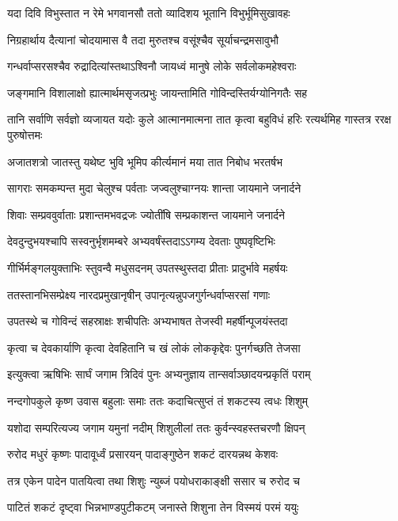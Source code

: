 \twolineshloka
{यदा दिवि विभुस्तात न रेमे भगवानसौ}
{ततो व्यादिशय भूतानि विभुर्भूमिसुखावहः}


\twolineshloka
{निग्रहार्थाय दैत्यानां चोदयामास वै तदा}
{मुरुतश्च वसूंश्चैव सूर्याचन्द्रमसावुभौ}


\twolineshloka
{गन्धर्वाप्सरसश्चैव रुद्रादित्यांस्तथाऽश्विनौ}
{जायध्वं मानुषे लोके सर्वलोकमहेश्वराः}


\twolineshloka
{जङ्गमानि विशालाक्षो ह्यात्मार्थमसृजत्प्रभुः}
{जायन्तामिति गोविन्दस्तिर्यग्योनिगतैः सह}


\fourlineindentedshloka
{तानि सर्वाणि सर्वज्ञो व्यजायत यदोः कुले}
{आत्मानमात्मना तात कृत्वा बहुविधं हरिः}
{रत्यर्थमिह गास्तत्र ररक्ष पुरुषोत्तमः}
{}


\twolineshloka
{अजातशत्रो जातस्तु यथेष्ट भुवि भूमिप}
{कीर्त्यमानं मया तात निबोध भरतर्षभ}


\twolineshloka
{सागराः समकम्पन्त मुदा चेलुश्च पर्वताः}
{जज्वलुश्चाग्नयः शान्ता जायमाने जनार्दने}


\twolineshloka
{शिवाः सम्प्रववुर्वाताः प्रशान्तमभवद्रजः}
{ज्योतींषि सम्प्रकाशन्त जायमाने जनार्दने}


\twolineshloka
{देवदुन्दुभयश्चापि सस्वनुर्भृशमम्बरे}
{अभ्यवर्षंस्तदाऽऽगम्य देवताः पुष्पवृष्टिभिः}


\twolineshloka
{गीर्भिर्मङ्गलयुक्ताभिः स्तुवन्वै मधुसदनम्}
{उपतस्थुस्तदा प्रीताः प्रादुर्भावे महर्षयः}


\twolineshloka
{ततस्तानभिसम्प्रेक्ष्य नारदप्रमुखानृषीन्}
{उपानृत्यन्नुपजगुर्गन्धर्वाप्सरसां गणाः}


\twolineshloka
{उपतस्थे च गोविन्दं सहस्राक्षः शचीपतिः}
{अभ्यभाषत तेजस्वी महर्षीन्पूजयंस्तदा}


\twolineshloka
{कृत्वा च देवकार्याणि कृत्वा देवहितानि च}
{खं लोकं लोककृद्देवः पुनर्गच्छति तेजसा}


\twolineshloka
{इत्युक्त्वा ऋषिभिः सार्घं जगाम त्रिदिवं पुनः}
{अभ्यनुज्ञाय तान्सर्वाञ्छादयन्प्रकृतिं पराम्}


\twolineshloka
{नन्दगोपकुले कृष्ण उवास बहुलाः समाः}
{ततः कदाचित्सुप्तं तं शकटस्य त्वधः शिशुम्}


\twolineshloka
{यशोदा सम्परित्यज्य जगाम यमुनां नदीम्}
{शिशुलीलां ततः कुर्वन्स्वहस्तचरणौ क्षिपन्}


\twolineshloka
{रुरोद मधुरं कृष्णः पादावूर्ध्वं प्रसारयन्}
{पादाङ्गुष्ठेन शकटं दारयन्नथ केशवः}


\twolineshloka
{तत्र एकेन पादेन पातयित्वा तथा शिशुः}
{न्युब्जं पयोधराकाङ्क्षी ससार च रुरोद च}


\twolineshloka
{पाटितं शकटं दृष्ट्वा भिन्नभाण्डपुटीकटम्}
{जनास्ते शिशुना तेन विस्मयं परमं ययुः}


